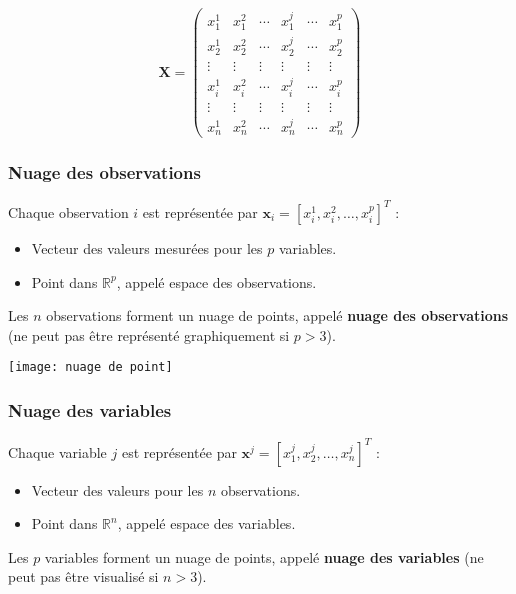 \documentclass[10pt,a4paper]{article}
\begin{document}
\[
\mathbf{X} = \begin{pmatrix}
x_1^1 & x_1^2 & \cdots & x_1^j & \cdots & x_1^p \\
x_2^1 & x_2^2 & \cdots & x_2^j & \cdots & x_2^p \\
\vdots & \vdots & \vdots & \vdots & \vdots & \vdots \\
x_i^1 & x_i^2 & \cdots & x_i^j & \cdots & x_i^p \\
\vdots & \vdots & \vdots & \vdots & \vdots & \vdots \\
x_n^1 & x_n^2 & \cdots & x_n^j & \cdots & x_n^p
\end{pmatrix}
\]

\subsubsection*{Nuage des observations}
Chaque observation $i$ est représentée par $\mathbf{x}_i = [x_i^1, x_i^2, \ldots, x_i^p]^T$ :
\begin{itemize}
    \item Vecteur des valeurs mesurées pour les $p$ variables.
    \item Point dans $\mathbb{R}^p$, appelé espace des observations.
\end{itemize}

Les $n$ observations forment un nuage de points, appelé \textbf{nuage des observations} (ne peut pas être représenté graphiquement si $p > 3$).

\texttt{[image: nuage de point]}

\subsubsection*{Nuage des variables}
Chaque variable $j$ est représentée par $\mathbf{x}^j = [x_1^j, x_2^j, \ldots, x_n^j]^T$ :
\begin{itemize}
    \item Vecteur des valeurs pour les $n$ observations.
    \item Point dans $\mathbb{R}^n$, appelé espace des variables.
\end{itemize}

Les $p$ variables forment un nuage de points, appelé \textbf{nuage des variables} (ne peut pas être visualisé si $n > 3$).
\end{document}
